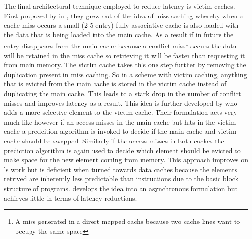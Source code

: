 The final architectural technique employed to reduce latency is victim caches. First proposed by \citet{jouppiImprovingDirectmappedCache1990} in \citeyear{jouppiImprovingDirectmappedCache1990}, they grew out of the idea of miss caching whereby when a cache miss occurs a small (2-5 entry) fully associative cache is also loaded with the data that is being loaded into the main cache. As a result if in future the entry disappears from the main cache because a conflict miss\footnote{A miss generated in a direct mapped cache because two cache lines want to occupy the same space} occurs the data will be retained in the miss cache so retrieving it will be faster than requesting it from main memory. The victim cache takes this one step further by removing the duplication present in miss caching. So in a scheme with victim caching, anything that is evicted from the main cache is stored in the victim cache instead of duplicating the main cache. This leads to a stark drop in the number of conflict misses and improves latency as a result. This idea is further developed by \cite{stiliadisSelectiveVictimCaching1997} who adds a more selective element to the victim cache. Their formulation acts very much like \citeauthor{jouppiImprovingDirectmappedCache1990} however if an access misses in the main cache but hits in the victim cache a predcition algorithm is invoked to decide if the main cache and victim cache should be swapped. Similarly if the access misses in both caches the prediction algorithm is again used to decide which element should be evicted to make space for the new element coming from memory. This approach improves on \citeauthor{jouppiImprovingDirectmappedCache1990}'s work but is deficient when turned towards data caches because the elements retrived are inherently less predictable than instructions due to the basic block structure of programs. \citet{hormdeeAsynchronousVictimCache2002} develops the idea into an asynchronous formulation but achieves little in terms of latency reductions.

